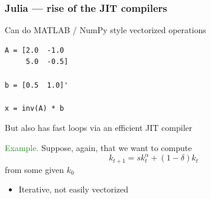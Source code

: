 \documentclass[
    xcolor={svgnames,dvipsnames},
    hyperref={colorlinks, citecolor=DeepPink4, linkcolor=DarkRed, urlcolor=DarkBlue}
    ]{beamer}  %
\newcommand{\Eg}{\textcolor{ForestGreen}{Example. }}
\newcommand{\1}{\mathbbm 1}
\begin{document}
\begin{frame}

    \begin{figure}
       \begin{center} %
       \end{center}
    \end{figure}


\end{frame}


\begin{frame}[fragile]
    \frametitle{Julia --- rise of the JIT compilers}

    Can do MATLAB / NumPy style vectorized operations

    \begin{verbatim}
A = [2.0  -1.0
     5.0  -0.5]

b = [0.5  1.0]'

x = inv(A) * b
    \end{verbatim}
    
\end{frame}


\begin{frame}
    
    But also has fast loops via an efficient JIT compiler

    \vspace{0.5em}
    \vspace{0.5em}
    \Eg Suppose, again, that we want to compute 
    \begin{equation*}
        k_{t+1} = s k_t^\alpha + (1 - \delta) k_t
    \end{equation*}
    from some given $k_0$ 


    \vspace{0.5em}
    \vspace{0.5em}
    \vspace{0.5em}
    \vspace{0.5em}
    \begin{itemize}
        \item Iterative, not easily vectorized
    \end{itemize}

\end{frame}
\end{document}
